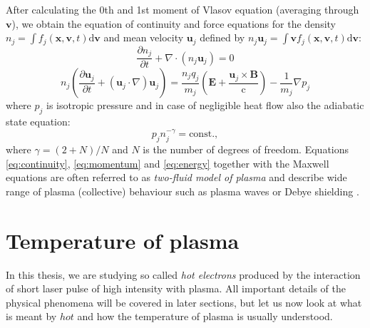 After calculating the 0th and 1st moment of Vlasov equation (averaging through $\bm{v}$), we obtain the equation of continuity and force equations for the density $n_j = \int f_j\left(\bm{x},\bm{v},t\right)\mathrm{d}\bm{v}$ and mean velocity $\bm{u}_j$ defined by $n_j\bm{u}_j = \int \bm{v} f_j\left(\bm{x},\bm{v},t\right)\mathrm{d}\bm{v}$:
\begin{equation}
	\label{eq:continuity}
	\frac{\partial n_j}{\partial t} + \nabla\cdot\left(n_j \bm{u}_j\right) = 0
\end{equation}
\begin{equation}
	\label{eq:momentum}
	n_j \left(\frac{\partial \bm{u}_j}{\partial t} + \left(\bm{u}_j\cdot\nabla\right)\bm{u}_j\right) = \frac{n_j q_j}{m_j}\left(\bm{E} + \frac{\bm{u}_j\times\bm{B}}{\mathrm{c}}\right) - \frac{1}{m_j}\nabla p_j
\end{equation}
\noindent where $p_j$ is isotropic pressure and in case of negligible heat flow also the adiabatic state equation:
\begin{equation}
	\label{eq:energy}
	p_jn_j^{-\gamma} = \mathrm{const.},
\end{equation}
\noindent where $\gamma = \left(2+N\right)/N$ and $N$ is the number of degrees of freedom. Equations \ref{eq:continuity}, \ref{eq:momentum} and \ref{eq:energy} together with the Maxwell equations are often referred to as \textit{two-fluid model of plasma} and describe wide range of plasma (collective) behaviour such as plasma waves or Debye shielding \cite{laser-plasma4}.

\section{Temperature of plasma}
\label{sec:temperature-intro}
In this thesis, we are studying so called \textit{hot electrons} produced by the interaction of short laser pulse of high intensity with plasma. All important details of the physical phenomena will be covered in later sections, but let us now look at what is meant by $hot$ and how the temperature of plasma is usually understood.

